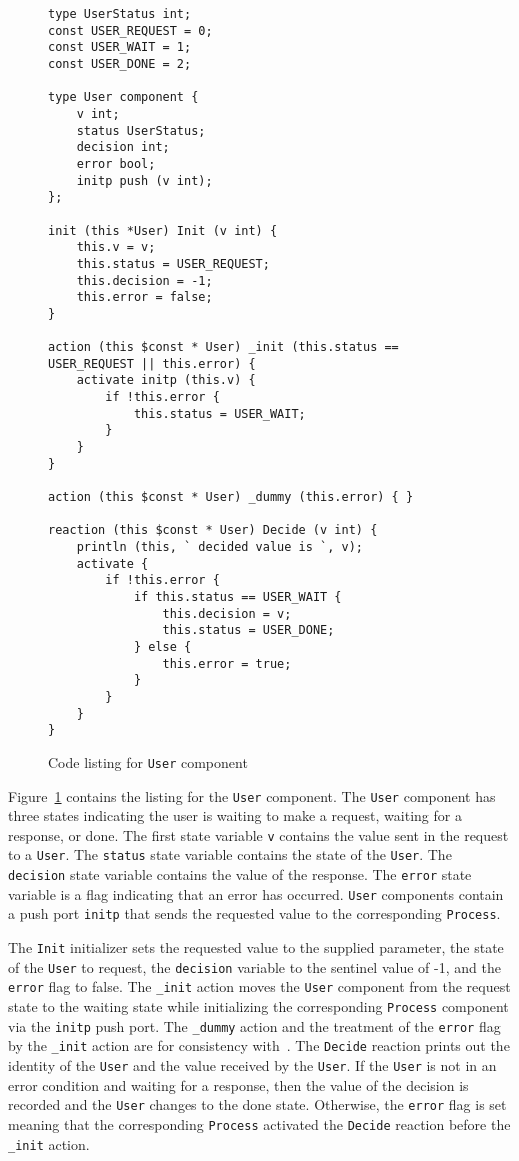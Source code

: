 \begin{figure}
\begin{verbatim}
type UserStatus int;
const USER_REQUEST = 0;
const USER_WAIT = 1;
const USER_DONE = 2;

type User component {
    v int;
    status UserStatus;
    decision int;
    error bool;
    initp push (v int);
};

init (this *User) Init (v int) {
    this.v = v;
    this.status = USER_REQUEST;
    this.decision = -1;
    this.error = false;
}

action (this $const * User) _init (this.status == USER_REQUEST || this.error) {
    activate initp (this.v) {
        if !this.error {
            this.status = USER_WAIT;
        }
    }
}

action (this $const * User) _dummy (this.error) { }

reaction (this $const * User) Decide (v int) {
    println (this, ` decided value is `, v);
    activate {
        if !this.error {
            if this.status == USER_WAIT {
                this.decision = v;
                this.status = USER_DONE;
            } else {
                this.error = true;
            }
        }
    }
}
\end{verbatim}
\cprotect\caption{Code listing for \verb+User+ component \label{user}}
\end{figure}

Figure~\ref{user} contains the listing for the \verb+User+ component.
The \verb+User+ component has three states indicating the user is waiting to make a request, waiting for a response, or done.
The first state variable \verb+v+ contains the value sent in the request to a \verb+User+.
The \verb+status+ state variable contains the state of the \verb+User+.
The \verb+decision+ state variable contains the value of the response.
The \verb+error+ state variable is a flag indicating that an error has occurred.
\verb+User+ components contain a push port \verb+initp+ that sends the requested value to the corresponding \verb+Process+.

The \verb+Init+ initializer sets the requested value to the supplied parameter, the state of the \verb+User+ to request, the \verb+decision+ variable to the sentinel value of -1, and the \verb+error+ flag to false.
The \verb+_init+ action moves the \verb+User+ component from the request state to the waiting state while initializing the corresponding \verb+Process+ component via the \verb+initp+ push port.
The \verb+_dummy+ action and the treatment of the \verb+error+ flag by the \verb+_init+ action are for consistency with~\cite{nancy1996distributed}.
The \verb+Decide+ reaction prints out the identity of the \verb+User+ and the value received by the \verb+User+.
If the \verb+User+ is not in an error condition and waiting for a response, then the value of the decision is recorded and the \verb+User+ changes to the done state.
Otherwise, the \verb+error+ flag is set meaning that the corresponding \verb+Process+ activated the \verb+Decide+ reaction before the \verb+_init+ action.

